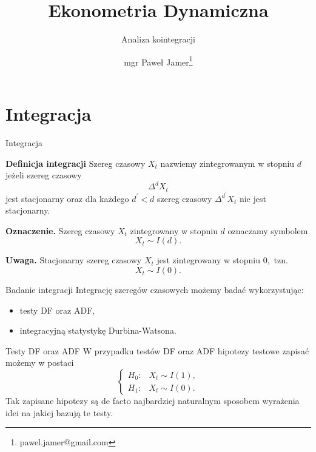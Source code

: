 \documentclass[a4paper, 11pt]{beamer}
\title{Ekonometria Dynamiczna}
\subtitle{Analiza kointegracji}
\author{mgr Paweł Jamer\thanks{pawel.jamer@gmail.com}}
\begin{document}
	\begin{frame}
		\titlepage
	\end{frame}
	
	\section{Integracja}

	\begin{frame}{Integracja}
		\begin{block}{\textbf{Definicja integracji}}
			Szereg czasowy $X_t$ nazwiemy zintegrowanym w stopniu $d$ jeżeli szereg czasowy \[
				\Delta^{d} X_t
			\] jest stacjonarny oraz dla każdego $d^{\prime} < d$ szereg czasowy $\Delta^{d^{\prime}} X_t$ nie jest stacjonarny.
		\end{block}
		\begin{alert}{\textbf{Oznaczenie.}}
			Szereg czasowy $X_t$ zintegrowany w stopniu $d$ oznaczamy symbolem \[
				X_t \sim I\left(d\right).
			\]
		\end{alert}
		\begin{alert}{\textbf{Uwaga.}}
			Stacjonarny szereg czasowy $X_t$ jest zintegrowany w stopniu $0,$ tzn. \[
				X_t \sim I\left(0\right).
			\]
		\end{alert}
	\end{frame}
	
	\begin{frame}{Badanie integracji}
		Integrację szeregów czasowych możemy badać wykorzystując:
		\begin{itemize}
			\item testy DF oraz ADF,
			\item integracyjną statystykę Durbina-Watsona.
		\end{itemize}
	\end{frame}
	
	\begin{frame}{Testy DF oraz ADF}
		W przypadku testów DF oraz ADF hipotezy testowe zapisać możemy w postaci \[
			\begin{cases}
				H_0: & X_t \sim I\left(1\right),\\
				H_1: & X_t \sim I\left(0\right).
			\end{cases}
		\] Tak zapisane hipotezy są de facto najbardziej naturalnym sposobem wyrażenia
		idei na jakiej bazują te testy.
	\end{frame}
	
\end{document}

